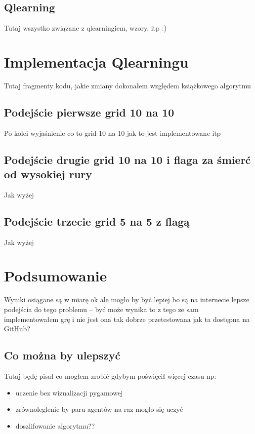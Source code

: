 \documentclass[a4paper,12pt,oneside]{book}
\begin{document}
\section{Q\dywiz learning}
Tutaj wszystko związane z qlearningiem, wzory, itp :)

\chapter{Implementacja Q\dywiz learningu}
\label{chapter:implementacja_qlearningu}
Tutaj fragmenty kodu, jakie zmiany dokonałem względem książkowego algorytmu
\section{Podejście pierwsze grid 10 na 10}
Po kolei wyjaśnienie co to grid 10 na 10 jak to jest implementowane itp
\section{Podejście drugie grid 10 na 10 i flaga za śmierć od wysokiej rury}
Jak wyżej
\section{Podejście trzecie grid 5 na 5 z flagą}
Jak wyżej

\chapter{Podsumowanie}
Wyniki osiągane są w miarę ok ale mogło by być lepiej bo są na internecie lepsze
podejścia do tego problemu -- być może wynika to z tego ze sam implementowałem grę
i nie jest ona tak dobrze przetestowana jak ta dostępna na GitHub?
\section{Co można by ulepszyć}
Tutaj będę pisał co mogłem zrobić gdybym poświęcił więcej czasu np:
\begin{itemize}
\item uczenie bez wizualizacji pygamowej
\item zrównoleglenie by paru agentów na raz mogło się uczyć
\item doszlifowanie algorytmu??
\end{itemize}




\end{document}
